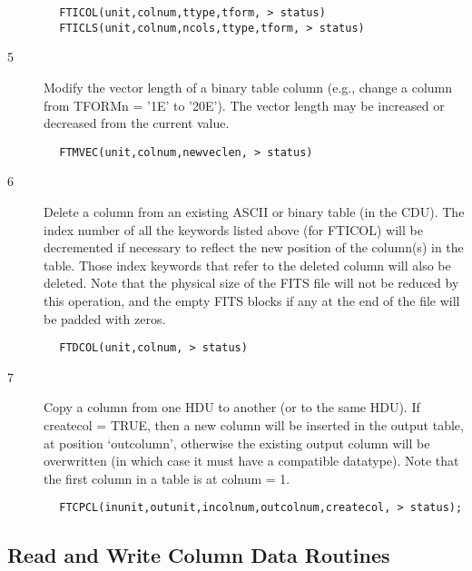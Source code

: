 \documentclass[11pt]{book}
\begin{document}
\begin{verbatim}
        FTICOL(unit,colnum,ttype,tform, > status)
        FTICLS(unit,colnum,ncols,ttype,tform, > status)
\end{verbatim}

\begin{description}
\item[5 ] Modify the vector length of a binary table column (e.g.,
    change a column from TFORMn = '1E' to '20E').  The vector
   length may be increased or decreased from the current value.
\end{description}

\begin{verbatim}
        FTMVEC(unit,colnum,newveclen, > status)
\end{verbatim}

\begin{description}
\item[6 ] Delete a column from an existing ASCII or binary table (in the CDU).
    The index number of all the keywords listed above (for FTICOL) will be
    decremented if necessary to reflect the new position of the column(s) in
    the table.  Those index keywords that refer to the deleted column will
    also be deleted.  Note that the physical size of the FITS file will
    not be reduced by this operation, and the empty FITS blocks if any
   at the end of the file will be padded with zeros.
\end{description}

\begin{verbatim}
        FTDCOL(unit,colnum, > status)
\end{verbatim}

\begin{description}
\item[7 ] Copy a column from one HDU to another (or to the same HDU).  If
    createcol = TRUE, then a new column will be inserted in the output
    table, at position `outcolumn', otherwise the existing output column will
    be overwritten (in which case it must have a compatible datatype).
   Note that the first column in a table is at colnum = 1.
\end{description}

\begin{verbatim}
        FTCPCL(inunit,outunit,incolnum,outcolnum,createcol, > status);
\end{verbatim}

\subsection{Read and Write Column Data Routines \label{FTPCLS}}
\end{document}
